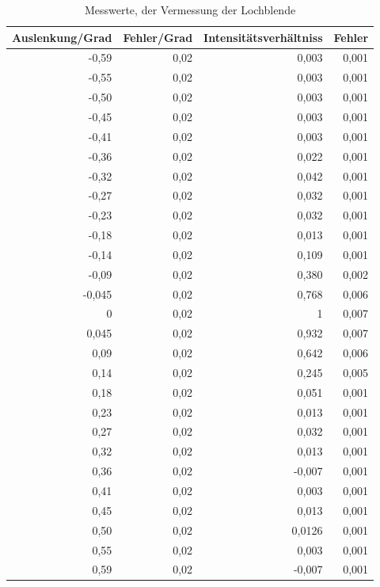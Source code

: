 \documentclass[12pt]{scrartcl}
\begin{document}
\begin{table}[H]
\caption{Messwerte, der Vermessung der Lochblende}
\begin{center}
\begin{tabular}{|r|r|r|r|}
\hline
\multicolumn{1}{|l|}{Auslenkung/Grad} & \multicolumn{1}{l|}{Fehler/Grad} & \multicolumn{1}{l|}{Intensitätsverhältniss} & \multicolumn{1}{l|}{Fehler} \\ \hline
-0,59 & 0,02 & 0,003 & 0,001 \\ \hline
-0,55 & 0,02 & 0,003 & 0,001 \\ \hline
-0,50 & 0,02 & 0,003 & 0,001 \\ \hline
-0,45 & 0,02 & 0,003 & 0,001 \\ \hline
-0,41 & 0,02 & 0,003 & 0,001 \\ \hline
-0,36 & 0,02 & 0,022 & 0,001 \\ \hline
-0,32 & 0,02 & 0,042 & 0,001 \\ \hline
-0,27 & 0,02 & 0,032 & 0,001 \\ \hline
-0,23 & 0,02 & 0,032 & 0,001 \\ \hline
-0,18 & 0,02 & 0,013 & 0,001 \\ \hline
-0,14 & 0,02 & 0,109 & 0,001 \\ \hline
-0,09 & 0,02 & 0,380 & 0,002 \\ \hline
-0,045 & 0,02 & 0,768 & 0,006 \\ \hline
0 & 0,02 & 1 & 0,007 \\ \hline
0,045 & 0,02 & 0,932 & 0,007 \\ \hline
0,09 & 0,02 & 0,642 & 0,006 \\ \hline
0,14 & 0,02 & 0,245 & 0,005 \\ \hline
0,18 & 0,02 & 0,051 & 0,001 \\ \hline
0,23 & 0,02 & 0,013 & 0,001 \\ \hline
0,27 & 0,02 & 0,032 & 0,001 \\ \hline
0,32 & 0,02 & 0,013 & 0,001 \\ \hline
0,36 & 0,02 & -0,007 & 0,001 \\ \hline
0,41 & 0,02 & 0,003 & 0,001 \\ \hline
0,45 & 0,02 & 0,013 & 0,001 \\ \hline
0,50 & 0,02 & 0,0126 & 0,001 \\ \hline
0,55 & 0,02 & 0,003 & 0,001 \\ \hline
0,59 & 0,02 & -0,007 & 0,001 \\ \hline
\end{tabular}
\end{center}
\label{tab:a_2_m}
\end{table}
\end{document}
